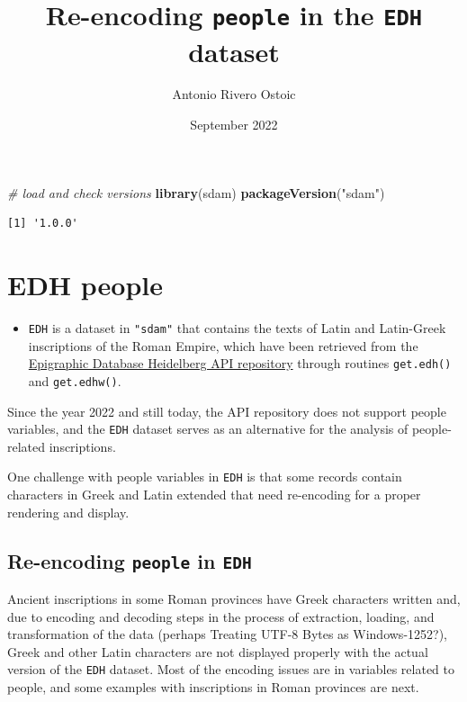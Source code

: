 \documentclass[a4paper,11pt]{memoir}
\title{Re-encoding \texttt{people} in the \texttt{EDH} dataset}
\author{Antonio Rivero Ostoic}
\date{September 2022}
\newenvironment{Shaded}{\begin{snugshade}}{\end{snugshade}}
\newcommand{\CommentTok}[1]{\textcolor[rgb]{0.56,0.35,0.01}{\textit{#1}}}
\newcommand{\KeywordTok}[1]{\textcolor[rgb]{0.13,0.29,0.53}{\textbf{#1}}}
\newcommand{\NormalTok}[1]{#1}
\newcommand{\StringTok}[1]{\textcolor[rgb]{0.31,0.60,0.02}{#1}}
\providecommand{\tightlist}{%
  \setlength{\itemsep}{0pt}\setlength{\parskip}{0pt}}
\begin{document}
\maketitle


\begin{Shaded}
\begin{Highlighting}[]
\CommentTok{# load and check versions}
\KeywordTok{library}\NormalTok{(sdam)}
\KeywordTok{packageVersion}\NormalTok{(}\StringTok{"sdam"}\NormalTok{)}
\end{Highlighting}
\end{Shaded}

\begin{verbatim}
[1] '1.0.0'
\end{verbatim}

\hypertarget{edh-people}{%
\section{EDH people}\label{edh-people}}

\begin{itemize}
\tightlist
\item
  \texttt{EDH} is a dataset in \texttt{"sdam"} that contains the texts
  of Latin and Latin-Greek inscriptions of the Roman Empire, which have
  been retrieved from the
  \href{https://edh-www.adw.uni-heidelberg.de/data/api}{Epigraphic
  Database Heidelberg API repository} through routines
  \texttt{get.edh()} and \texttt{get.edhw()}.
\end{itemize}

Since the year 2022 and still today, the API repository does not support
people variables, and the \texttt{EDH} dataset serves as an alternative
for the analysis of people-related inscriptions.

One challenge with people variables in \texttt{EDH} is that some records
contain characters in Greek and Latin extended that need re-encoding for
a proper rendering and display.

\hypertarget{re-encoding-people-in-edh}{%
\subsection{\texorpdfstring{Re-encoding \texttt{people} in
\texttt{EDH}}{Re-encoding people in EDH}}\label{re-encoding-people-in-edh}}

Ancient inscriptions in some Roman provinces have Greek characters
written and, due to encoding and decoding steps in the process of
extraction, loading, and transformation of the data (perhaps Treating
UTF-8 Bytes as Windows-1252?), Greek and other Latin characters are not
displayed properly with the actual version of the \texttt{EDH} dataset.
Most of the encoding issues are in variables related to people, and some
examples with inscriptions in Roman provinces are next.
\end{document}
